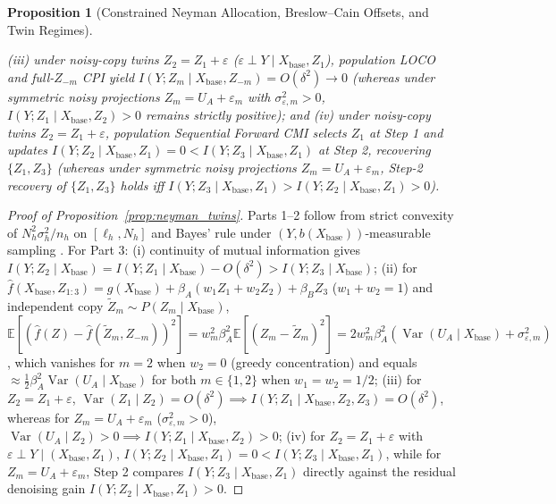 \documentclass[11pt]{article}
\newtheorem{proposition}{Proposition}
\theoremstyle{remark}
\begin{document}
\begin{proposition}[Constrained Neyman Allocation, Breslow--Cain Offsets, and Twin Regimes]
\begin{enumerate}
  (iii) under noisy-copy twins $Z_2 = Z_1 + \varepsilon$ ($\varepsilon \perp Y \mid X_{\text{base}}, Z_1$), population LOCO and \citet{chamma2023statistically} full-$Z_{-m}$ CPI yield $I(Y; Z_m \mid X_{\text{base}}, Z_{-m}) = O(\delta^2) \to 0$ (whereas under symmetric noisy projections $Z_m = U_A + \varepsilon_m$ with $\sigma_{\varepsilon,m}^2 > 0$, $I(Y; Z_1 \mid X_{\text{base}}, Z_2) > 0$ remains strictly positive); and
  (iv) under noisy-copy twins $Z_2 = Z_1 + \varepsilon$, population Sequential Forward CMI selects $Z_1$ at Step 1 and updates $I(Y; Z_2 \mid X_{\text{base}}, Z_1) = 0 < I(Y; Z_3 \mid X_{\text{base}}, Z_1)$ at Step 2, recovering $\{Z_1, Z_3\}$ (whereas under symmetric noisy projections $Z_m = U_A + \varepsilon_m$, Step-2 recovery of $\{Z_1, Z_3\}$ holds iff $I(Y; Z_3 \mid X_{\text{base}}, Z_1) > I(Y; Z_2 \mid X_{\text{base}}, Z_1) > 0$).
\end{enumerate}
\end{proposition}

\begin{proof}[Proof of Proposition~\ref{prop:neyman_twins}]
Parts 1--2 follow from strict convexity of $N_h^2\sigma_h^2/n_h$ on $[\ell_h, N_h]$ and Bayes' rule under $(Y, b(X_{\text{base}}))$-measurable sampling \citep{breslow1988logistic}. For Part 3: (i) continuity of mutual information gives $I(Y; Z_2 \mid X_{\text{base}}) = I(Y; Z_1 \mid X_{\text{base}}) - O(\delta^2) > I(Y; Z_3 \mid X_{\text{base}})$; (ii) for $\hat{f}(X_{\text{base}}, Z_{1:3}) = g(X_{\text{base}}) + \beta_A(w_1 Z_1 + w_2 Z_2) + \beta_B Z_3$ ($w_1 + w_2 = 1$) and independent copy $\tilde{Z}_m \sim P(Z_m \mid X_{\text{base}})$, $\mathbb{E}[(\hat{f}(Z) - \hat{f}(\tilde{Z}_m, Z_{-m}))^2] = w_m^2 \beta_A^2 \mathbb{E}[(Z_m - \tilde{Z}_m)^2] = 2 w_m^2 \beta_A^2 (\operatorname{Var}(U_A \mid X_{\text{base}}) + \sigma_{\varepsilon,m}^2)$, which vanishes for $m=2$ when $w_2 = 0$ (greedy concentration) and equals $\approx \frac{1}{2}\beta_A^2 \operatorname{Var}(U_A \mid X_{\text{base}})$ for both $m \in \{1,2\}$ when $w_1 = w_2 = 1/2$; (iii) for $Z_2 = Z_1 + \varepsilon$, $\operatorname{Var}(Z_1 \mid Z_2) = O(\delta^2) \implies I(Y; Z_1 \mid X_{\text{base}}, Z_2, Z_3) = O(\delta^2)$, whereas for $Z_m = U_A + \varepsilon_m$ ($\sigma_{\varepsilon,m}^2 > 0$), $\operatorname{Var}(U_A \mid Z_2) > 0 \implies I(Y; Z_1 \mid X_{\text{base}}, Z_2) > 0$; (iv) for $Z_2 = Z_1 + \varepsilon$ with $\varepsilon \perp Y \mid (X_{\text{base}}, Z_1)$, $I(Y; Z_2 \mid X_{\text{base}}, Z_1) = 0 < I(Y; Z_3 \mid X_{\text{base}}, Z_1)$, while for $Z_m = U_A + \varepsilon_m$, Step 2 compares $I(Y; Z_3 \mid X_{\text{base}}, Z_1)$ directly against the residual denoising gain $I(Y; Z_2 \mid X_{\text{base}}, Z_1) > 0$.
\end{proof}
\end{document}
